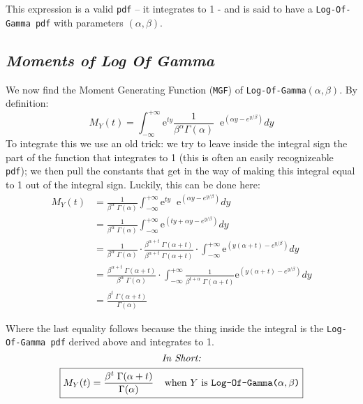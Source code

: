 \documentclass[12pt]{article}
\begin{document}
This expression  is a valid \texttt{pdf} -- it integrates to 1 - and is said to have a  \texttt{Log-Of-Gamma pdf} with parameters $(\alpha, \beta)$.

\bigskip 
\bigskip 
\subsection*{\color{TealBlue}\emph{Moments of Log Of Gamma}}

We now find the Moment Generating Function (\texttt{MGF}) of \texttt{Log-Of-Gamma}$(\alpha, \beta)$. By definition:
$$
M_Y(t) = \int_{-\infty}^{+\infty} \mathrm{e}^{ty} \frac{1}{\beta^\alpha \Gamma(\alpha)} \;\; \mathrm{e}^{\left(\alpha y - e^{y/\beta}\right)} dy
$$
To integrate this we use an old trick: we try to leave inside the integral sign the part of the function that integrates to 1 (this is often an easily recognizeable \texttt{pdf}); we then pull the constants that get in the way of making this integral equal to 1 out of the integral sign. Luckily, this can be done here:
\begin{align*}
M_Y(t) &= \frac{1}{\beta^\alpha \; \Gamma(\alpha)} \int_{-\infty}^{+\infty} \mathrm{e}^{ty} \;\; \mathrm{e}^{\left(\alpha y - e^{y/\beta}\right)} dy\\
&= \frac{1}{\beta^\alpha \; \Gamma(\alpha)} \int_{-\infty}^{+\infty} \mathrm{e}^{\left(ty +\alpha y - e^{y/\beta}\right)} dy\\
&= \frac{1}{\beta^\alpha \; \Gamma(\alpha)} \cdot \frac{\beta^{\alpha + t} \; \Gamma(\alpha + t)}{\beta^{\alpha + t} \; \Gamma(\alpha + t)} \cdot \int_{-\infty}^{+\infty} \mathrm{e}^{\left(y(\alpha + t) - e^{y/\beta}\right)} dy\\
&= \frac{ \beta^{\alpha + t} \; \Gamma(\alpha + t) }{\beta^\alpha \; \Gamma(\alpha)}  \cdot \int_{-\infty}^{+\infty} \frac{1}{\beta^{t+\alpha} \; \Gamma(\alpha + t)} \mathrm{e}^{\left(y(\alpha + t) - e^{y/\beta}\right)} dy\\
&= \frac{\beta^t \; \Gamma(\alpha + t)}{\Gamma(\alpha)} 
\end{align*}

Where the last equality follows because the thing inside the integral is the \texttt{Log-Of-Gamma pdf} derived above and integrates to 1.
\bigskip
$$\text{\emph{In Short:}}$$
$$
\boxed{M_Y(t) = \frac{\beta^t \; \Gamma(\alpha + t)}{\Gamma(\alpha)}   \; \; \; \; \text{when $Y$ is \texttt{Log-Of-Gamma($\alpha, \beta$)}} }
$$

\bigskip 
\bigskip 
\end{document}
